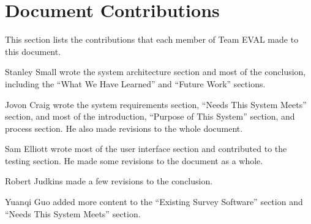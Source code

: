\documentclass{article}
\begin{document}
\newpage
\appendix

\section{Document Contributions}

This section lists the contributions that each member of Team EVAL made to this document.

\medskip

Stanley Small wrote the system architecture section and most of the conclusion, including the ``What We Have Learned'' and ``Future Work'' sections.

Jovon Craig wrote the system requirements section, ``Needs This System Meets'' section, and most of the introduction, ``Purpose of This System'' section, and process section. He also made revisions to the whole document.

Sam Elliott wrote most of the user interface section and contributed to the testing section. He made some revisions to the document as a whole.

Robert Judkins made a few revisions to the conclusion.

Yuanqi Guo added more content to the ``Existing Survey Software'' section and ``Needs This System Meets'' section. 
\end{document}
